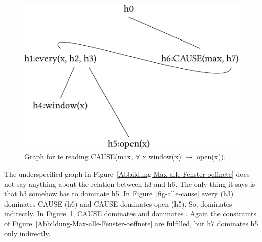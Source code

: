 \begin{figure}
\centering

\includegraphics{Figures/solution-mrs-cause-all-open-cropped.pdf}
\caption{Graph for te reading CAUSE(max, $\forall$ x window(x) $\to$ open(x)).\label{fig-cause-alle}}
\end{figure}%
The underspecified graph in Figure~\ref{Abbildung-Max-alle-Fenster-oeffnete} does not say anything
about the relation between h3 and h6. The only thing it says is that h3 somehow has to dominate
h5. In Figure~\ref{fig-alle-cause} every (h3) dominates CAUSE (h6) and CAUSE dominates open
(h5). So,  dominates  indirectly. In Figure~\ref{fig-cause-alle}, CAUSE
dominates  and  dominates . Again the constraints of
Figure~\ref{Abbildung-Max-alle-Fenster-oeffnete} are fulfilled, but h7 dominates h5 only indirectly.

